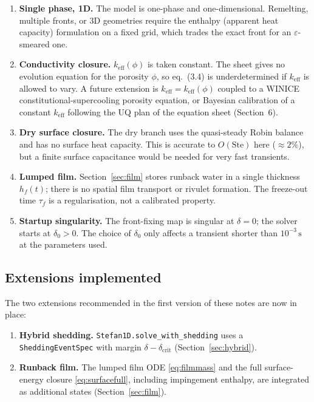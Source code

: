\documentclass[11pt,a4paper]{article}
\newcommand{\keff}{k_{\mathrm{eff}}}
\begin{document}
\begin{enumerate}[leftmargin=1.5em,itemsep=3pt]
  \item \textbf{Single phase, 1D.} The model is one-phase and one-dimensional. Remelting,
        multiple fronts, or 3D geometries require the enthalpy (apparent heat capacity)
        formulation on a fixed grid, which trades the exact front for an
        $\varepsilon$-smeared one.
  \item \textbf{Conductivity closure.} $\keff(\phi)$ is taken constant. The sheet gives
        no evolution equation for the porosity $\phi$, so eq.~(3.4) is underdetermined if
        $\keff$ is allowed to vary. A future extension is
        $\keff=\keff(\phi)$ coupled to a WINICE constitutional-supercooling porosity
        equation, or Bayesian calibration of a constant $\keff$ following the UQ plan of
        the equation sheet (Section~6).
  \item \textbf{Dry surface closure.} The dry branch uses the quasi-steady Robin balance
        and has no surface heat capacity. This is accurate to $O(\mathrm{Ste})$ here
        ($\approx2\%$), but a finite surface capacitance would be needed for very fast
        transients.
  \item \textbf{Lumped film.} Section~\ref{sec:film} stores runback water in a single
        thickness $h_f(t)$; there is no spatial film transport or rivulet formation.
        The freeze-out time $\tau_f$ is a regularisation, not a calibrated property.
  \item \textbf{Startup singularity.} The front-fixing map is singular at $\delta=0$; the
        solver starts at $\delta_0>0$. The choice of $\delta_0$ only affects a transient
        shorter than $10^{-3}\,\mathrm{s}$ at the parameters used.
\end{enumerate}

\subsection*{Extensions implemented}

The two extensions recommended in the first version of these notes are now in place:
\begin{enumerate}[leftmargin=1.5em,itemsep=2pt]
  \item \textbf{Hybrid shedding.} \texttt{Stefan1D.solve\_with\_shedding} uses a
        \texttt{SheddingEventSpec} with margin $\delta-\delta_{\mathrm{crit}}$
        (Section~\ref{sec:hybrid}).
  \item \textbf{Runback film.} The lumped film ODE \eqref{eq:filmmass} and the full
        surface-energy closure \eqref{eq:surfacefull}, including impingement enthalpy,
        are integrated as additional states (Section~\ref{sec:film}).
\end{enumerate}
\end{document}
